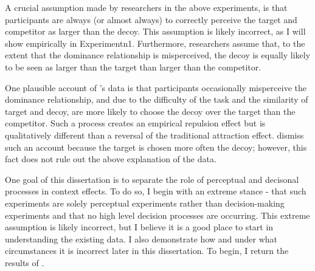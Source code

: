 A crucial assumption made by researchers in the above experiments, is that participants are always (or almost always) to correctly perceive the target and competitor as larger than the decoy. This assumption is likely incorrect, as I will show empirically in Experimentn1. Furthermore, researchers assume that, to the extent that the dominance relationship is misperceived, the decoy is equally likely to be seen as larger than the target than larger than the competitor. 

One plausible account of \textcite{spektorWhenGoodLooks2018b}'s data is that participants occasionally misperceive the dominance relationship, and due to the difficulty of the task and the similarity of target and decoy, are more likely to choose the decoy over the target than the competitor. Such a process creates an empirical repulsion effect but is qualitatively different than a reversal of the traditional attraction effect. \textcite{spektorWhenGoodLooks2018b} dismiss such an account because the target is chosen more often the decoy; however, this fact does not rule out the above explanation of the data.

One goal of this dissertation is to separate the role of perceptual and decisonal processes in context effects. To do so, I begin with an extreme stance - that such experiments are solely perceptual experiments rather than decision-making experiments and that no high level decision processes are occurring. This extreme assumption is likely incorrect, but I believe it is a good place to start in understanding the existing data. I also demonstrate how and under what circumstances it is incorrect later in this dissertation. To begin, I return the results of \textcite{spektorWhenGoodLooks2018b}. 

